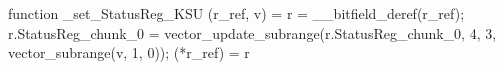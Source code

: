 function _set_StatusReg_KSU (r_ref, v) = {
    r = __bitfield_deref(r_ref);
    r.StatusReg_chunk_0 = vector_update_subrange(r.StatusReg_chunk_0, 4, 3, vector_subrange(v, 1, 0));
    (*r_ref) = r
}

